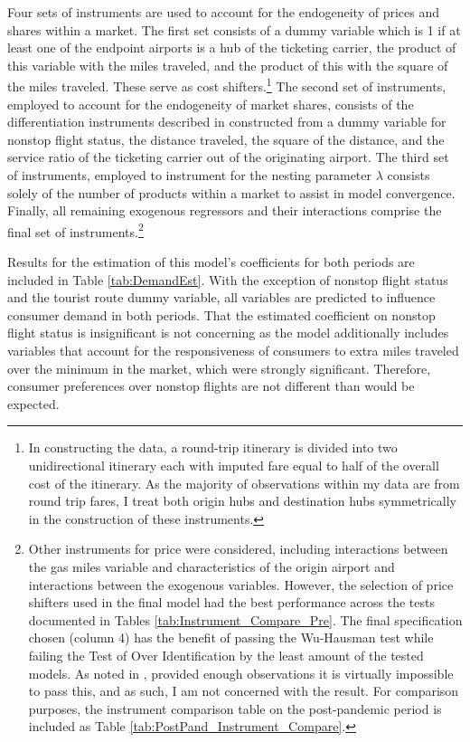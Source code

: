 \documentclass{article}
\begin{document}
	 Four sets of instruments are used to account for the endogeneity of prices and shares within a market. The first set consists of a dummy variable which is 1 if at least one of the endpoint airports is a hub of the ticketing carrier, the product of this variable with the miles traveled, and the product of this with the square of the miles traveled. These serve as cost shifters.\footnote{In constructing the data, a round-trip itinerary is divided into two unidirectional itinerary each with imputed fare equal to half of the overall cost of the itinerary. As the majority of observations within my data are from round trip fares, I treat both origin hubs and destination hubs symmetrically in the construction of these instruments.} The second set of instruments, employed to account for the endogeneity of market shares, consists of the differentiation instruments described in \citet{gandhi_measuring_2019} constructed from a dummy variable for nonstop flight status, the distance traveled, the square of the distance, and the service ratio of the ticketing carrier out of the originating airport. The third set of instruments, employed to instrument for the nesting parameter $\lambda$ consists solely of the number of products within a market to assist in model convergence. Finally, all remaining exogenous regressors and their interactions comprise the final set of instruments.\footnote{Other instruments for price were considered, including interactions between the gas miles variable and characteristics of the origin airport and interactions between the exogenous variables. However, the selection of price shifters used in the final model had the best performance across the tests documented in Tables \ref{tab:Instrument_Compare_Pre}. The final specification chosen (column 4) has the benefit of passing the Wu-Hausman test while failing the Test of Over Identification by the least amount of the tested models. As noted in \citet{nevo_measuring_2001}, provided enough observations it is virtually impossible to pass this, and as such, I am not concerned with the result. For comparison purposes, the instrument comparison table on the post-pandemic period is included as Table \ref{tab:PostPand_Instrument_Compare}.}
	
    Results for the estimation of this model's coefficients for both periods are included in Table \ref{tab:DemandEst}. With the exception of nonstop flight status and the tourist route dummy variable, all variables are predicted to influence consumer demand in both periods. That the estimated coefficient on nonstop flight status is insignificant is not concerning as the model additionally includes variables that account for the responsiveness of consumers to extra miles traveled over the minimum in the market, which were strongly significant. Therefore, consumer preferences over nonstop flights are not different than would be expected.  
    
\end{document}
